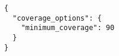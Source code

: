 \lstset{language=bash}
\begin{lstlisting}[frame=htrbl, caption={coveralls.json}, label={lst:projekt_coveralls_json}]
{
  "coverage_options": {
    "minimum_coverage": 90
  }
}
\end{lstlisting}
